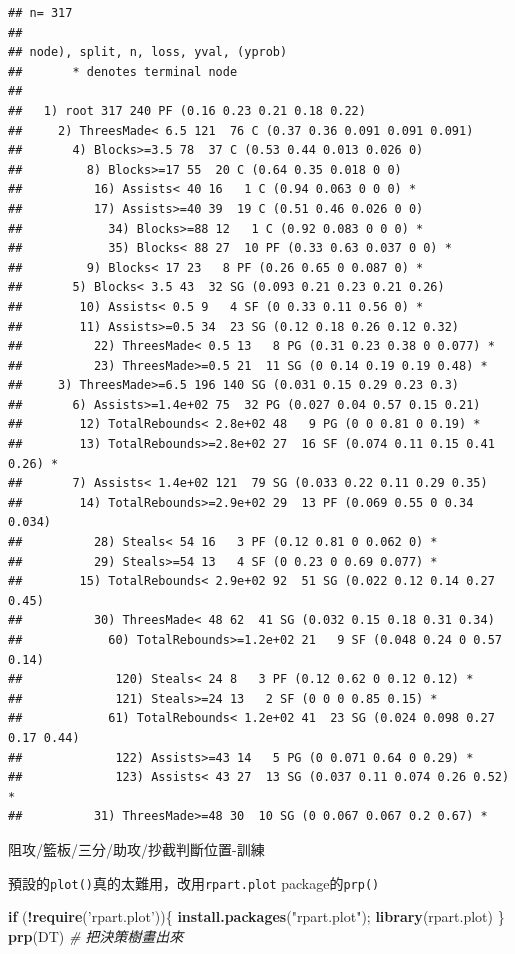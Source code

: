 \documentclass[
]{book}
\newenvironment{Shaded}{\begin{snugshade}}{\end{snugshade}}
\newcommand{\CommentTok}[1]{\textcolor[rgb]{0.56,0.35,0.01}{\textit{#1}}}
\newcommand{\ControlFlowTok}[1]{\textcolor[rgb]{0.13,0.29,0.53}{\textbf{#1}}}
\newcommand{\KeywordTok}[1]{\textcolor[rgb]{0.13,0.29,0.53}{\textbf{#1}}}
\newcommand{\NormalTok}[1]{#1}
\newcommand{\OperatorTok}[1]{\textcolor[rgb]{0.81,0.36,0.00}{\textbf{#1}}}
\newcommand{\StringTok}[1]{\textcolor[rgb]{0.31,0.60,0.02}{#1}}
\begin{document}
\begin{verbatim}
## n= 317 
## 
## node), split, n, loss, yval, (yprob)
##       * denotes terminal node
## 
##   1) root 317 240 PF (0.16 0.23 0.21 0.18 0.22)  
##     2) ThreesMade< 6.5 121  76 C (0.37 0.36 0.091 0.091 0.091)  
##       4) Blocks>=3.5 78  37 C (0.53 0.44 0.013 0.026 0)  
##         8) Blocks>=17 55  20 C (0.64 0.35 0.018 0 0)  
##          16) Assists< 40 16   1 C (0.94 0.063 0 0 0) *
##          17) Assists>=40 39  19 C (0.51 0.46 0.026 0 0)  
##            34) Blocks>=88 12   1 C (0.92 0.083 0 0 0) *
##            35) Blocks< 88 27  10 PF (0.33 0.63 0.037 0 0) *
##         9) Blocks< 17 23   8 PF (0.26 0.65 0 0.087 0) *
##       5) Blocks< 3.5 43  32 SG (0.093 0.21 0.23 0.21 0.26)  
##        10) Assists< 0.5 9   4 SF (0 0.33 0.11 0.56 0) *
##        11) Assists>=0.5 34  23 SG (0.12 0.18 0.26 0.12 0.32)  
##          22) ThreesMade< 0.5 13   8 PG (0.31 0.23 0.38 0 0.077) *
##          23) ThreesMade>=0.5 21  11 SG (0 0.14 0.19 0.19 0.48) *
##     3) ThreesMade>=6.5 196 140 SG (0.031 0.15 0.29 0.23 0.3)  
##       6) Assists>=1.4e+02 75  32 PG (0.027 0.04 0.57 0.15 0.21)  
##        12) TotalRebounds< 2.8e+02 48   9 PG (0 0 0.81 0 0.19) *
##        13) TotalRebounds>=2.8e+02 27  16 SF (0.074 0.11 0.15 0.41 0.26) *
##       7) Assists< 1.4e+02 121  79 SG (0.033 0.22 0.11 0.29 0.35)  
##        14) TotalRebounds>=2.9e+02 29  13 PF (0.069 0.55 0 0.34 0.034)  
##          28) Steals< 54 16   3 PF (0.12 0.81 0 0.062 0) *
##          29) Steals>=54 13   4 SF (0 0.23 0 0.69 0.077) *
##        15) TotalRebounds< 2.9e+02 92  51 SG (0.022 0.12 0.14 0.27 0.45)  
##          30) ThreesMade< 48 62  41 SG (0.032 0.15 0.18 0.31 0.34)  
##            60) TotalRebounds>=1.2e+02 21   9 SF (0.048 0.24 0 0.57 0.14)  
##             120) Steals< 24 8   3 PF (0.12 0.62 0 0.12 0.12) *
##             121) Steals>=24 13   2 SF (0 0 0 0.85 0.15) *
##            61) TotalRebounds< 1.2e+02 41  23 SG (0.024 0.098 0.27 0.17 0.44)  
##             122) Assists>=43 14   5 PG (0 0.071 0.64 0 0.29) *
##             123) Assists< 43 27  13 SG (0.037 0.11 0.074 0.26 0.52) *
##          31) ThreesMade>=48 30  10 SG (0 0.067 0.067 0.2 0.67) *
\end{verbatim}

阻攻/籃板/三分/助攻/抄截判斷位置-訓練

預設的\texttt{plot()}真的太難用，改用\texttt{rpart.plot} package的\texttt{prp()}

\begin{Shaded}
\begin{Highlighting}[]
\ControlFlowTok{if}\NormalTok{ (}\OperatorTok{!}\KeywordTok{require}\NormalTok{(}\StringTok{'rpart.plot'}\NormalTok{))\{}
  \KeywordTok{install.packages}\NormalTok{(}\StringTok{"rpart.plot"}\NormalTok{); }
  \KeywordTok{library}\NormalTok{(rpart.plot)}
\NormalTok{\}}
\KeywordTok{prp}\NormalTok{(DT)	}\CommentTok{# 把決策樹畫出來}
\end{Highlighting}
\end{Shaded}
\end{document}
